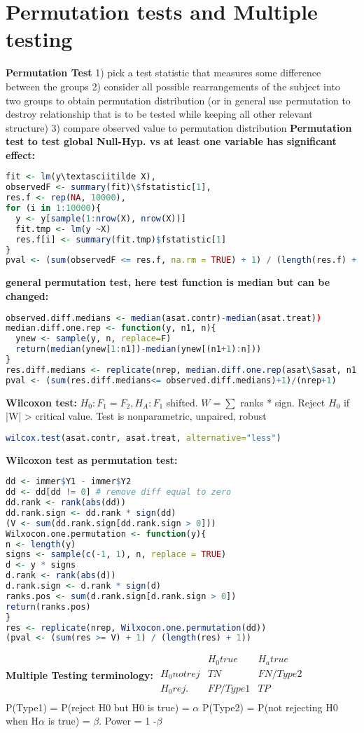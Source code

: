 \section{Permutation tests and Multiple testing}
\textbf{Permutation Test} 1) pick a test statistic that measures some difference between the groups 2) consider all possible rearrangements of the subject into two groups to obtain permutation distribution (or in general use permutation to destroy relationship that is to be tested while keeping all other relevant structure) 3) compare observed value to permutation distribution
\textbf{Permutation test to test global Null-Hyp. vs at least one variable has significant effect:}
\begin{lstlisting}[language=R]
fit <- lm(y\textasciitilde X),
observedF <- summary(fit)\$fstatistic[1],
res.f <- rep(NA, 10000),
for (i in 1:10000){
  y <- y[sample(1:nrow(X), nrow(X))]
  fit.tmp <- lm(y ~X)
  res.f[i] <- summary(fit.tmp)$fstatistic[1]
}
pval <- (sum(observedF <= res.f, na.rm = TRUE) + 1) / (length(res.f) + 1)\end{lstlisting}
\textbf{general permutation test, here test function is median but can be changed: }
\begin{lstlisting}[language=R]
observed.diff.medians <- median(asat.contr)-median(asat.treat))
median.diff.one.rep <- function(y, n1, n){
  ynew <- sample(y, n, replace=F)
  return(median(ynew[1:n1])-median(ynew[(n1+1):n]))
}
res.diff.medians <- replicate(nrep, median.diff.one.rep(asat\$asat, n1, n))
pval <- (sum(res.diff.medians<= observed.diff.medians)+1)/(nrep+1)
\end{lstlisting}
\textbf{Wilcoxon test: } $H_0: F_1 = F_2, H_A: F_1$ shifted. $W = \sum$ ranks * sign. Reject $H_0$ if |W| > critical value.
Test is nonparametric, unpaired, robust 
\begin{lstlisting}[language=R]
wilcox.test(asat.contr, asat.treat, alternative="less")
\end{lstlisting} 
\textbf{Wilcoxon test as permutation test:} 
\begin{lstlisting}[language=R]
dd <- immer$Y1 - immer$Y2
dd <- dd[dd != 0] # remove diff equal to zero
dd.rank <- rank(abs(dd))
dd.rank.sign <- dd.rank * sign(dd)
(V <- sum(dd.rank.sign[dd.rank.sign > 0]))
Wilxocon.one.permutation <- function(y){
n <- length(y)
signs <- sample(c(-1, 1), n, replace = TRUE)
d <- y * signs
d.rank <- rank(abs(d))
d.rank.sign <- d.rank * sign(d)
ranks.pos <- sum(d.rank.sign[d.rank.sign > 0])
return(ranks.pos)
}
res <- replicate(nrep, Wilxocon.one.permutation(dd))
(pval <- (sum(res >= V) + 1) / (length(res) + 1))
\end{lstlisting}
\textbf{Multiple Testing terminology: }
$\begin{matrix}
& H_0 true & H_a true \\
H_0 not rej & TN & FN/Type2\\
H_0rej. & FP/Type1 & TP \\
\end{matrix}$\\
P(Type1) = P(reject H0 but H0 is true) = $\alpha$
P(Type2) = P(not rejecting H0 when H$\alpha$ is true) = $\beta$. Power = 1 -$\beta$

